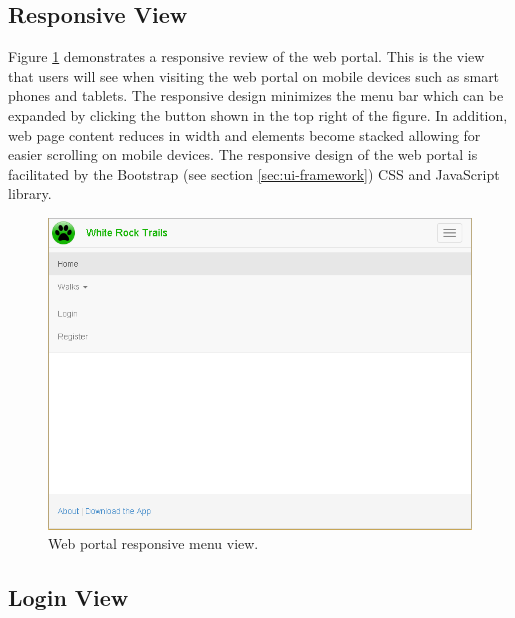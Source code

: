 \documentclass[11pt,a4paper]{article}
\begin{document}
\subsection{Responsive View}

Figure \ref{fig:home-responsive} demonstrates a responsive review of the web portal. This is the view that users will see when visiting the web portal on mobile devices such as smart phones and tablets. The responsive design minimizes the menu bar which can be expanded by clicking the button shown in the top right of the figure. In addition, web page content reduces in width and elements become stacked allowing for easier scrolling on mobile devices. The responsive design of the web portal is facilitated by the Bootstrap (see section \ref{sec:ui-framework}) CSS and JavaScript library.

\begin{figure}[H]
\centering
\includegraphics[width=0.8\linewidth]{./img/webportal/home-responsive}
\caption{Web portal responsive menu view.}
\label{fig:home-responsive}
\end{figure}

\subsection{Login View}
\end{document}
